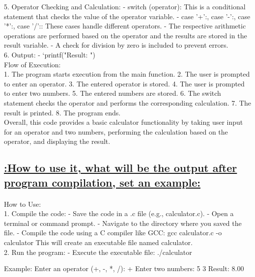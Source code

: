 \documentclass[a4paper,12pt]{article}
\begin{document}
5. Operator Checking and Calculation:
   - switch (operator): This is a conditional statement that checks the value of the operator variable.
   - case '+':, case '-':, case '*':, case '/':: These cases handle different operators.
   - The respective arithmetic operations are performed based on the operator and the results are stored in the result variable.
   - A check for division by zero is included to prevent errors.\\

6. Output:
   - `printf("Result: ")\\

Flow of Execution:\\

1. The program starts execution from the main function.
2. The user is prompted to enter an operator.
3. The entered operator is stored.
4. The user is prompted to enter two numbers.
5. The entered numbers are stored.
6. The switch statement checks the operator and performs the corresponding calculation.
7. The result is printed.
8. The program ends.\\
Overall, this code provides a basic calculator functionality by taking user input for an operator and two numbers, performing the calculation based on the operator, and displaying the result.

\begin{center}
\section*{\uline{:How to use it, what will be the output after program compilation, set an example:}}
\end{center}

\paragraph{}
How to Use:\\

1. Compile the code:
   - Save the code in a .c file (e.g., calculator.c).
   - Open a terminal or command prompt.
   - Navigate to the directory where you saved the file.
   - Compile the code using a C compiler like GCC:
     gcc calculator.c -o calculator
     This will create an executable file named calculator.\\

2. Run the program:
   - Execute the executable file:
     ./calculator

Example:
Enter an operator (+, -, *, /): +
Enter two numbers: 5 3
Result: 8.00\\
\end{document}
